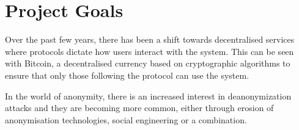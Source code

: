 \section{Project Goals}
	Over the past few years, there has been a shift towards decentralised services where protocols dictate how users interact with the system. This can be seen with Bitcoin, a decentralised currency based on cryptographic algorithms  to ensure that only those following the protocol can use the system.
	
	In the world of anonymity, there is an increased interest in deanonymization attacks and they are becoming more common, either through erosion of anonymisation technologies, social engineering or a combination.